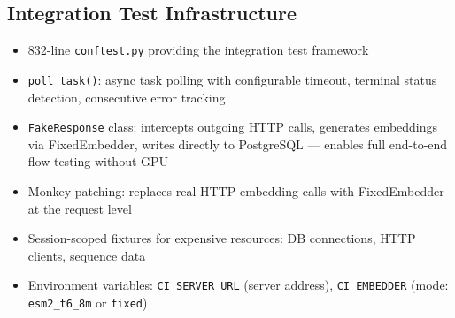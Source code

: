 \subsection{Integration Test Infrastructure}\label{sec:integration-infra}
\begin{itemize}
  \item 832-line \texttt{conftest.py} providing the integration test framework
  \item \texttt{poll\_task()}: async task polling with configurable timeout, terminal status detection, consecutive error tracking
  \item \texttt{FakeResponse} class: intercepts outgoing HTTP calls, generates embeddings via FixedEmbedder, writes directly to PostgreSQL --- enables full end-to-end flow testing without GPU
  \item Monkey-patching: replaces real HTTP embedding calls with FixedEmbedder at the request level
  \item Session-scoped fixtures for expensive resources: DB connections, HTTP clients, sequence data
  \item Environment variables: \texttt{CI\_SERVER\_URL} (server address), \texttt{CI\_EMBEDDER} (mode: \texttt{esm2\_t6\_8m} or \texttt{fixed})
\end{itemize}

